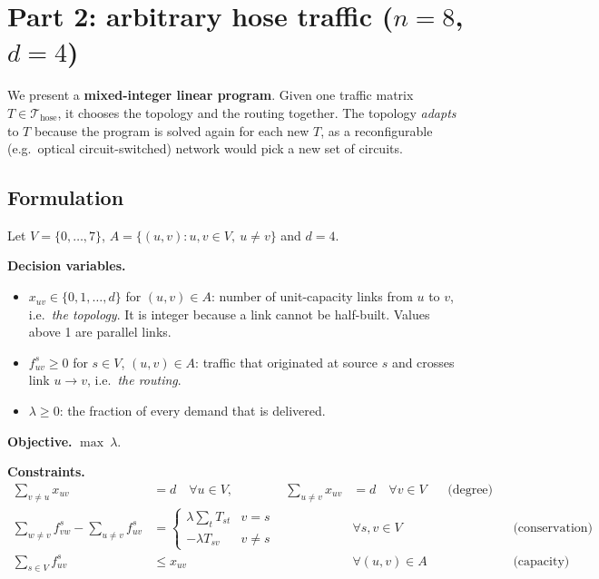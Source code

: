 \documentclass[11pt,letterpaper]{article}
\begin{document}
\section{Part 2: arbitrary hose traffic ($n=8$, $d=4$)}
We present a \textbf{mixed-integer linear program}. Given one traffic matrix
$T\in\mathcal{T}_{\text{hose}}$, it chooses the topology and the routing
together. The topology \emph{adapts} to $T$ because the program is solved again for
each new $T$, as a reconfigurable (e.g.\ optical circuit-switched) network would
pick a new set of circuits.

\subsection{Formulation}
Let $V=\{0,\dots,7\}$, $A=\{(u,v): u,v\in V,\ u\neq v\}$ and $d=4$.

\textbf{Decision variables.}
\begin{itemize}
\item $x_{uv}\in\{0,1,\dots,d\}$ for $(u,v)\in A$: number of unit-capacity links
from $u$ to $v$, i.e.\ \emph{the topology}. It is integer because a link cannot be
half-built. Values above 1 are parallel links.
\item $f^s_{uv}\ge0$ for $s\in V$, $(u,v)\in A$: traffic that originated at source
$s$ and crosses link $u\to v$, i.e.\ \emph{the routing}.
\item $\lambda\ge0$: the fraction of every demand that is delivered.
\end{itemize}

\textbf{Objective.} $\displaystyle\max\ \lambda$.

\textbf{Constraints.}
\begin{align}
\textstyle\sum_{v\neq u} x_{uv} &= d \quad \forall u\in V,
&\textstyle\sum_{u\neq v} x_{uv} &= d \quad \forall v\in V
&& \text{(degree)}\\
\textstyle\sum_{w\neq v} f^s_{vw}-\sum_{u\neq v} f^s_{uv} &=
\begin{cases}\lambda\sum_t T_{st} & v=s\\ -\lambda T_{sv} & v\neq s\end{cases}
&& \forall s,v\in V
&& && \text{(conservation)}\\
\textstyle\sum_{s\in V} f^s_{uv} &\le x_{uv} && \forall (u,v)\in A
&& && \text{(capacity)}
\end{align}
\end{document}
